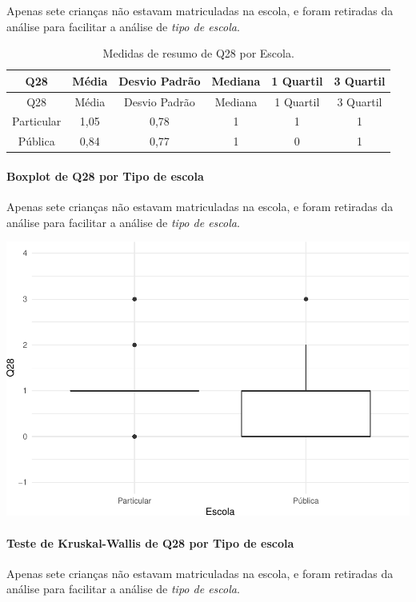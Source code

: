 \documentclass[]{article}
\let\oldparagraph\paragraph
\renewcommand{\paragraph}[1]{\oldparagraph{#1}\mbox{}}
\begin{document}
Apenas sete crianças não estavam matriculadas na escola, e foram retiradas da análise para facilitar a análise de \emph{tipo de escola}.

\begin{longtable}[]{@{}cccccc@{}}
\caption{\label{tab:unnamed-chunk-883}Medidas de resumo de Q28 por Escola.}\tabularnewline
\toprule
Q28 & Média & Desvio Padrão & Mediana & 1 Quartil & 3 Quartil\tabularnewline
\midrule
\endfirsthead
\toprule
Q28 & Média & Desvio Padrão & Mediana & 1 Quartil & 3 Quartil\tabularnewline
\midrule
\endhead
Particular & 1,05 & 0,78 & 1 & 1 & 1\tabularnewline
Pública & 0,84 & 0,77 & 1 & 0 & 1\tabularnewline
\bottomrule
\end{longtable}

\hypertarget{boxplot-de-q28-por-tipo-de-escola}{%
\paragraph{Boxplot de Q28 por Tipo de escola}\label{boxplot-de-q28-por-tipo-de-escola}}

Apenas sete crianças não estavam matriculadas na escola, e foram retiradas da análise para facilitar a análise de \emph{tipo de escola}.

\begin{center}\includegraphics[width=0.75\linewidth]{relatorio_covid19_files/figure-latex/unnamed-chunk-884-1} \end{center}

\hypertarget{teste-de-kruskal-wallis-de-q28-por-tipo-de-escola}{%
\paragraph{Teste de Kruskal-Wallis de Q28 por Tipo de escola}\label{teste-de-kruskal-wallis-de-q28-por-tipo-de-escola}}

Apenas sete crianças não estavam matriculadas na escola, e foram retiradas da análise para facilitar a análise de \emph{tipo de escola}.
\end{document}
